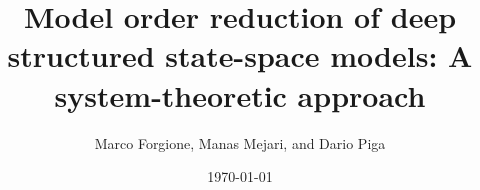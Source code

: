 \usepackage[english]{babel}
\usepackage{amsmath}
\usepackage[latin1]{inputenc}
\usepackage{units}
\usepackage{colortbl}
\usepackage{multimedia}
\usepackage{bm}

{
}

\newcommand{\Name}{\emph{dynoNet}}

\title[LRU reduction]{Model order reduction of deep structured state-space models: A system-theoretic approach}


\author[]{Marco Forgione, Manas Mejari, and Dario Piga}



\date[]{\today}


\subject{System identification with neural networks}


\newcommand{\q}{q} %
\newcommand{\A}{A} %
\newcommand{\ac}{a} %
\newcommand{\B}{B} %
\newcommand{\bb}{b} %
\newcommand{\Gmat}{\mathbb{G}} %
\newcommand{\tvec}[1]{\mathbf{#1}}
\newcommand{\mat}[1]{\bm{#1}}
\newcommand{\sens}[1]{\tilde{#1}}
\newcommand{\adjoint}[1]{\overline{#1}}
\newcommand{\loss}{\mathcal{L}}
\newcommand{\pdiff}[2]{\frac{\partial #1}{\partial #2}}
\newcommand{\nsamp}{T}

\newcommand{\conv}{*}
\newcommand{\ccorr}{\star}
\newcommand{\norm}[1]{\left \lVert #1 \right \rVert}
\DeclareMathOperator*\argmin{arg \, min}
\DeclareMathOperator*\cov{cov}

